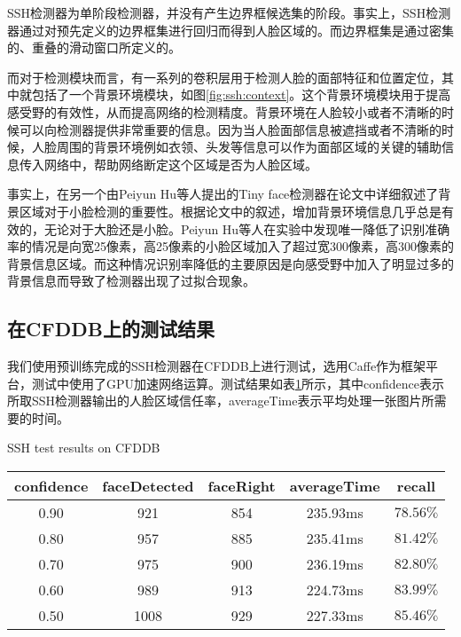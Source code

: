 SSH检测器为单阶段检测器，并没有产生边界框候选集的阶段。事实上，SSH检测器通过对预先定义的边界框集进行回归而得到人脸区域的。而边界框集是通过密集的、重叠的滑动窗口所定义的。

而对于检测模块而言，有一系列的卷积层用于检测人脸的面部特征和位置定位，其中就包括了一个背景环境模块，如图\ref{fig:ssh:context}。这个背景环境模块用于提高感受野的有效性，从而提高网络的检测精度。背景环境在人脸较小或者不清晰的时候可以向检测器提供非常重要的信息。因为当人脸面部信息被遮挡或者不清晰的时候，人脸周围的背景环境例如衣领、头发等信息可以作为面部区域的关键的辅助信息传入网络中，帮助网络断定这个区域是否为人脸区域。

事实上，在另一个由Peiyun Hu等人提出的Tiny face检测器\cite{hu2017finding}在论文中详细叙述了背景区域对于小脸检测的重要性。根据论文中的叙述，增加背景环境信息几乎总是有效的，无论对于大脸还是小脸。Peiyun Hu等人在实验中发现唯一降低了识别准确率的情况是向宽25像素，高25像素的小脸区域加入了超过宽300像素，高300像素的背景信息区域。而这种情况识别率降低的主要原因是向感受野中加入了明显过多的背景信息而导致了检测器出现了过拟合现象。


\subsection{在CFDDB上的测试结果}
\label{chap2:sshresult}

我们使用预训练完成的SSH检测器在CFDDB上进行测试，选用Caffe作为框架平台，测试中使用了GPU加速网络运算。测试结果如表\ref{tab:ssh}所示，其中confidence表示所取SSH检测器输出的人脸区域信任率，averageTime表示平均处理一张图片所需要的时间。

\begin{table}[!hpb]
	\centering
	{SSH test results on CFDDB}
	\label{tab:ssh}
	\begin{tabular}{ cccc | c }
		\hline
		confidence & faceDetected & faceRight & averageTime & recall\\
		\hline
		0.90 & 921 & 854 & 235.93ms & $78.56\%$\\
		0.80 & 957 & 885 & 235.41ms & $81.42\%$\\
		0.70 & 975 & 900 & 236.19ms & $82.80\%$\\
		0.60 & 989 & 913 & 224.73ms & $83.99\%$\\
		0.50 & 1008 & 929 & 227.33ms & $85.46\%$\\
		\hline
	\end{tabular}
\end{table}

